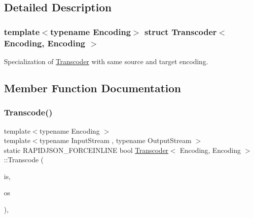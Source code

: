\subsection{Detailed Description}
\subsubsection*{template$<$typename Encoding$>$\newline
struct Transcoder$<$ Encoding, Encoding $>$}

Specialization of \hyperlink{structTranscoder}{Transcoder} with same source and target encoding. 

\subsection{Member Function Documentation}
\mbox{\label{structTranscoder_3_01Encoding_00_01Encoding_01_4_aad11cdc2b829123a7b9969e34d456813}} 
\subsubsection{\texorpdfstring{Transcode()}{Transcode()}}
{\footnotesize\ttfamily template$<$typename Encoding $>$ \\
template$<$typename Input\+Stream , typename Output\+Stream $>$ \\
static R\+A\+P\+I\+D\+J\+S\+O\+N\+\_\+\+F\+O\+R\+C\+E\+I\+N\+L\+I\+NE bool \hyperlink{structTranscoder}{Transcoder}$<$ Encoding, Encoding $>$\+::Transcode (\begin{DoxyParamCaption}\item[{Input\+Stream \&}]{is,  }\item[{Output\+Stream \&}]{os }\end{DoxyParamCaption})\hspace{0.3cm}{\ttfamily [inline]}, {\ttfamily [static]}}

\mbox{\label{structTranscoder_3_01Encoding_00_01Encoding_01_4_addf67decfff7d0de510c47842eb53cef}} 
